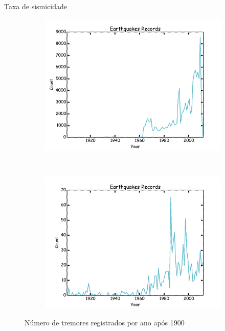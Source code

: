 \documentclass[ucs,8pt]{beamer}
\begin{document}
\begin{frame}{Taxa de sismicidade}
\begin{figure}[H]
	\centering
	\begin{subfigure}[t]{0.50\textwidth}
	  	\centering
		\includegraphics[width=1.0\textwidth]{hmtk_sa3_rate}
		\label{fig:sa_eq_record}
	\end{subfigure}%
	~ %
	\begin{subfigure}[t]{0.50\textwidth}
	  	\centering
		\includegraphics[width=1.0\textwidth]{hmtk_bsb2013_rate}
		\label{fig:br_eq_record}
    \end{subfigure}%
	\caption{Número de tremores registrados por ano após 1900}
	\label{fig:eq_record}
\end{figure}
\end{frame}
\end{document}
